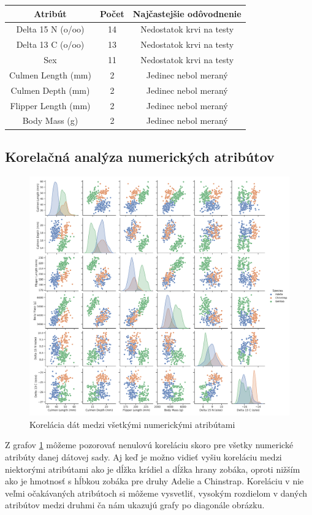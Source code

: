 \documentclass[a4paper, 16pt]{article}
\begin{document}
    \begin{table}[H]
    \centering
    \begin{tabular}{|c|c|c|}
    \hline
    \textbf{Atribút} & \textbf{Počet}& \textbf{Najčastejšie odôvodnenie}\\ \hline
     Delta 15 N (o/oo)  &     14 &    Nedostatok krvi na testy \\ \hline
      Delta 13 C (o/oo)&      13 &     Nedostatok krvi na testy\\ \hline
      Sex&        11   &  Nedostatok krvi na testy\\ \hline
      Culmen Length (mm)&      2 &   Jedinec nebol meraný \\ \hline
      Culmen Depth (mm)&    2   &    Jedinec nebol meraný\\ \hline
      Flipper Length (mm)&  2   &    Jedinec nebol meraný  \\ \hline
      Body Mass (g)&       2  &  Jedinec nebol meraný\\ \hline
    \end{tabular}

\end{table}

\subsection{Korelačná analýza numerických atribútov}

\begin{figure}[H]
    \centering
    \includegraphics[width=15cm]{graphs/corelation_a.pdf}
    \caption{Korelácia dát medzi všetkými numerickými atribútami}
    \label{fig:5}
\end{figure}
Z grafov \ref{fig:5} môžeme pozorovať nenulovú koreláciu skoro pre všetky numerické atribúty danej dátovej sady. Aj keď je možno vidieť vyšiu koreláciu medzi niektorými atribútami ako je dĺžka krídiel a dĺžka hrany zobáka, oproti nižším ako je hmotnosť s hĺbkou zobáka pre druhy Adelie a Chinstrap. Koreláciu v nie veľmi očakávaných atribútoch si môžeme vysvetliť, vysokým rozdielom v daných atribútov medzi druhmi ča nám ukazujú grafy po diagonále obrázku.
\end{document}

